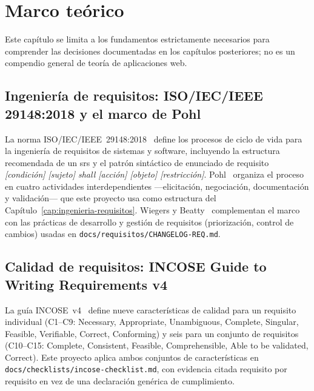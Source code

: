 
\chapter{Marco teórico}
\label{cap:marco-teorico}

Este capítulo se limita a los fundamentos estrictamente necesarios para
comprender las decisiones documentadas en los capítulos posteriores; no es
un compendio general de teoría de aplicaciones web.

\section{Ingeniería de requisitos: ISO/IEC/IEEE 29148:2018 y el marco de Pohl}

La norma ISO/IEC/IEEE~29148:2018~\cite{ISO29148} define los procesos de
ciclo de vida para la ingeniería de requisitos de sistemas y software,
incluyendo la estructura recomendada de un \gls{srs} y el patrón sintáctico de enunciado de requisito
\emph{[condición] [sujeto] shall [acción] [objeto] [restricción]}.
Pohl~\cite{POHL2010} organiza el proceso en cuatro actividades
interdependientes ---elicitación, negociación, documentación y
validación--- que este proyecto usa como estructura del
Capítulo~\ref{cap:ingenieria-requisitos}. Wiegers y
Beatty~\cite{WIEGERS2013} complementan el marco con las prácticas de
desarrollo y gestión de requisitos (priorización, control de cambios)
usadas en \texttt{docs/requisitos/CHANGELOG-REQ.md}.

\section{Calidad de requisitos: INCOSE Guide to Writing Requirements v4}

La guía INCOSE~v4~\cite{INCOSE2023} define nueve características de
calidad para un requisito individual (C1--C9: Necessary, Appropriate,
Unambiguous, Complete, Singular, Feasible, Verifiable, Correct,
Conforming) y seis para un conjunto de requisitos (C10--C15: Complete,
Consistent, Feasible, Comprehensible, Able to be validated, Correct). Este
proyecto aplica ambos conjuntos de características en
\texttt{docs/checklists/incose-checklist.md}, con evidencia citada
requisito por requisito en vez de una declaración genérica de
cumplimiento.

